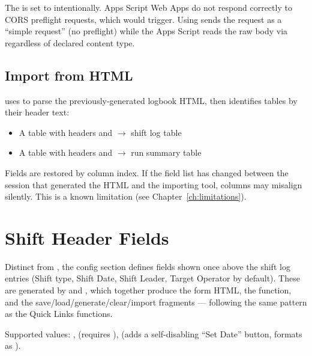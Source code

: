 The  is set to 
intentionally. Apps Script Web Apps do not respond correctly to CORS preflight
requests, which  would trigger. Using 
sends the request as a ``simple request'' (no preflight) while the Apps Script
reads the raw body via  regardless of declared
content type.

\section{Import from HTML}

 uses  to parse the
previously-generated logbook HTML, then identifies tables by their header
text:

\begin{itemize}
    \item A table with headers  and 
          $\rightarrow$ shift log table
    \item A table with headers  and 
          $\rightarrow$ run summary table
\end{itemize}

Fields are restored by column index. If the field list has changed between
the session that generated the HTML and the importing tool, columns may
misalign silently. This is a known limitation (see
Chapter~\ref{ch:limitations}).

\chapter{Shift Header Fields}

Distinct from , the  config section
defines fields shown once above the shift log entries (Shift type, Shift
Date, Shift Leader, Target Operator by default). These are generated by
 and ,
which together produce the form HTML, the  function, and
the save/load/generate/clear/import fragments --- following the same pattern
as the Quick Links functions.

Supported  values: ,  (requires
),  (adds a self-disabling ``Set Date'' button,
formats as ).

